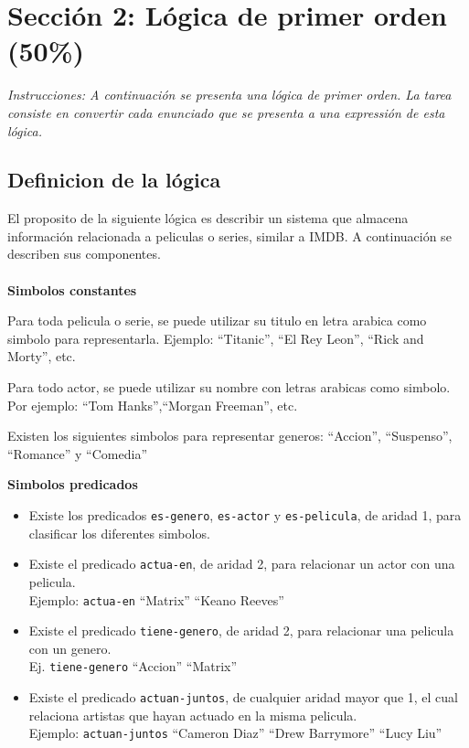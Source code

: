 \documentclass{article}
\begin{document}
\section*{Secci\'on 2: L\'ogica de primer orden (50\%)}
\emph{Instrucciones: A continuaci\'on se presenta una l\'ogica de primer orden. La tarea
        consiste en convertir cada enunciado que se presenta a una expressi\'on de esta
        l\'ogica.}

\subsection*{Definicion de la l\'ogica}
El proposito de la siguiente l\'ogica es describir un sistema que almacena informaci\'on
relacionada a peliculas o series, similar a IMDB. A continuaci\'on se describen sus componentes.
\\\vspace{0.1cm}\\{\bf Simbolos constantes}
\begin{itemize}
        \item{Para toda pelicula o serie, se puede utilizar su titulo en letra arabica como
        simbolo para representarla. Ejemplo: ``Titanic'', ``El Rey Leon'', ``Rick and Morty'',
                etc.}
        \item{Para todo actor, se puede utilizar su nombre con letras arabicas como
        simbolo. Por ejemplo: ``Tom Hanks'',``Morgan Freeman'', etc.
        \item{Existen los siguientes simbolos para representar generos: ``Accion'',
                ``Suspenso'', ``Romance'' y ``Comedia'' }}
\end{itemize}
{\bf Simbolos predicados}
\begin{itemize}
        \item{Existe los predicados \texttt{es-genero},
                \texttt{es-actor} y \texttt{es-pelicula}, de aridad 1, para clasificar
                los diferentes simbolos.}
        \item{Existe el predicado \texttt{actua-en}, de aridad 2, para relacionar
                un actor con una pelicula.\\Ejemplo: \texttt{actua-en} ``Matrix'' ``Keano Reeves''}
        \item{Existe el predicado \texttt{tiene-genero}, de aridad 2, para relacionar
                una pelicula con un genero.\\Ej. \texttt{tiene-genero} ``Accion'' ``Matrix''}
        \item{Existe el predicado \texttt{actuan-juntos}, de cualquier aridad mayor que 1,
                el cual relaciona artistas que hayan actuado en la misma pelicula.\\Ejemplo:
                \texttt{actuan-juntos} ``Cameron Diaz'' ``Drew Barrymore'' ``Lucy Liu''}
\end{itemize}
\end{document}
